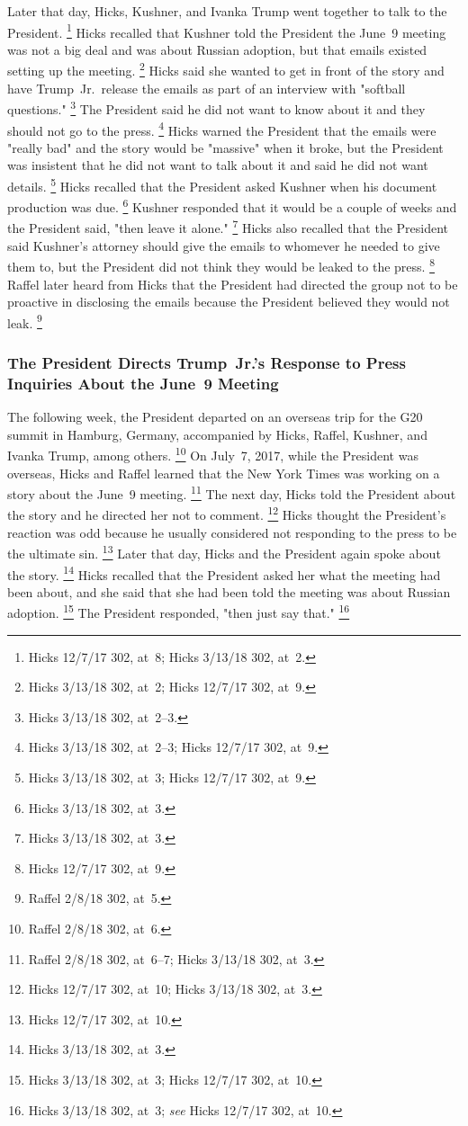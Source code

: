 Later that day, Hicks, Kushner, and Ivanka Trump went together to talk to the President.%
\footnote{Hicks 12/7/17 302, at~8;
Hicks 3/13/18 302, at~2.}
Hicks recalled that Kushner told the President the June~9 meeting was not a big deal and was about Russian adoption, but that emails existed setting up the meeting.%
\footnote{Hicks 3/13/18 302, at~2;
Hicks 12/7/17 302, at~9.}
Hicks said she wanted to get in front of the story and have Trump~Jr.\ release the emails as part of an interview with "softball questions."%
\footnote{Hicks 3/13/18 302, at~2--3.}
The President said he did not want to know about it and they should not go to the press.%
\footnote{Hicks 3/13/18 302, at~2--3;
Hicks 12/7/17 302, at~9.}
Hicks warned the President that the emails were "really bad" and the story would be "massive" when it broke, but the President was insistent that he did not want to talk about it and said he did not want details.%
\footnote{Hicks 3/13/18 302, at~3;
Hicks 12/7/17 302, at~9.}
Hicks recalled that the President asked Kushner when his document production was due.%
\footnote{Hicks 3/13/18 302, at~3.}
Kushner responded that it would be a couple of weeks and the President said, "then leave it alone."%
\footnote{Hicks 3/13/18 302, at~3.}
Hicks also recalled that the President said Kushner's attorney should give the emails to whomever he needed to give them to, but the President did not think they would be leaked to the press.%
\footnote{Hicks 12/7/17 302, at~9.}
Raffel later heard from Hicks that the President had directed the group not to be proactive in disclosing the emails because the President believed they would not leak.%
\footnote{Raffel 2/8/18 302, at~5.}

\subsubsection{The President Directs Trump~Jr.'s Response to Press Inquiries About the June~9 Meeting}

The following week, the President departed on an overseas trip for the G20 summit in Hamburg, Germany, accompanied by Hicks, Raffel, Kushner, and Ivanka Trump, among others.%
\footnote{Raffel 2/8/18 302, at~6.}
On July~7, 2017, while the President was overseas, Hicks and Raffel learned that the New York Times was working on a story about the June~9 meeting.%
\footnote{Raffel 2/8/18 302, at~6--7;
Hicks 3/13/18 302, at~3.}
The next day, Hicks told the President about the story and he directed her not to comment.%
\footnote{Hicks 12/7/17 302, at~10;
Hicks 3/13/18 302, at~3.}
Hicks thought the President's reaction was odd because he usually considered not responding to the press to be the ultimate sin.%
\footnote{Hicks 12/7/17 302, at~10.}
Later that day, Hicks and the President again spoke about the story.%
\footnote{Hicks 3/13/18 302, at~3.}
Hicks recalled that the President asked her what the meeting had been about, and she said that she had been told the meeting was about Russian adoption.%
\footnote{Hicks 3/13/18 302, at~3;
Hicks 12/7/17 302, at~10.}
The President responded, "then just say that."%
\footnote{Hicks 3/13/18 302, at~3;
\textit{see} Hicks 12/7/17 302, at~10.}

